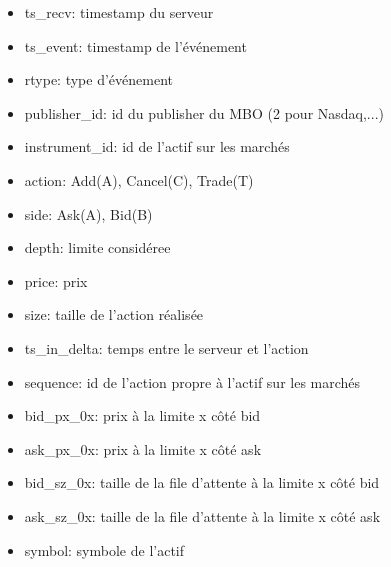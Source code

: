 \documentclass[12pt,a4paper]{article}
\theoremstyle{definition}
\theoremstyle{remark}
\begin{document}
\begin{itemize}
    \item ts\_recv: timestamp du serveur 
    \item ts\_event: timestamp de l’événement     
    \item rtype: type d’événement     
    \item publisher\_id: id du publisher du MBO (2 pour Nasdaq,...)
    \item instrument\_id: id de l'actif sur les marchés
    \item action: Add(A), Cancel(C), Trade(T)
    \item side: Ask(A), Bid(B)
    \item depth: limite considéree
    \item price: prix
    \item size: taille de l'action réalisée
    \item ts\_in\_delta: temps entre le serveur et l'action
    \item sequence: id de l'action propre à l'actif sur les marchés
    \item bid\_px\_0x: prix à la limite x côté bid
    \item ask\_px\_0x: prix à la limite x côté ask
    \item bid\_sz\_0x: taille de la file d'attente à la limite x côté bid
    \item ask\_sz\_0x: taille de la file d'attente à la limite x côté ask
    \item symbol: symbole de l'actif
\end{itemize}
\end{document}
